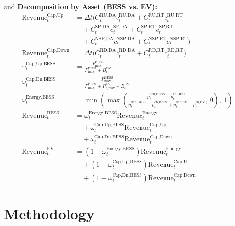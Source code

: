 \documentclass[conference]{IEEEtran}
\begin{document}
{and
\noindent \textbf{Decomposition by Asset (BESS vs. EV):}
\begin{align}
    \text{Revenue}_{t}^{\text{Cap,Up}} &= \Delta t \Big( C_{t}^{\text{RU,DA}} c_{t}^{\text{RU,DA}} + C_{t}^{\text{RU,RT}} c_{t}^{\text{RU,RT}} \nonumber \\
    & \quad + C_{t}^{\text{SP,DA}} c_{t}^{\text{SP,DA}} + C_{t}^{\text{SP,RT}} c_{t}^{\text{SP,RT}} \nonumber \\
    & \quad + C_{t}^{\text{NSP,DA}} c_{t}^{\text{NSP,DA}} + C_{t}^{\text{NSP,RT}} c_{t}^{\text{NSP,RT}} \Big) \\
    \text{Revenue}_{t}^{\text{Cap,Down}} &= \Delta t \Big( C_{t}^{\text{RD,DA}} c_{t}^{\text{RD,DA}} + C_{t}^{\text{RD,RT}} c_{t}^{\text{RD,RT}} \Big) \\
    \omega_{t}^{\text{Cap,Up,BESS}} &= \frac{P_{\text{max}}^{\text{BESS}}}{P_{\text{max}}^{\text{BESS}} + B_{t}^{\text{EV}}} \\
    \omega_{t}^{\text{Cap,Dn,BESS}} &= \frac{P_{\text{max}}^{\text{BESS}}}{P_{\text{max}}^{\text{BESS}} + P_{t, \text{max}}^{\text{EV}} - B_{t}^{\text{EV}}} \\
    \omega_{t}^{\text{Energy,BESS}} &= \min\left(\max\left(\frac{p_{t}^{\text{dch,BESS}} - p_{t}^{\text{ch,BESS}}}{p_{t}^{\text{dch,BESS}} - p_{t}^{\text{ch,BESS}} + p_{t}^{\text{dch,EV}} - p_{t}^{\text{ch,EV}}}, \, 0\right), \, 1\right) \\
    \text{Revenue}_{t}^{\text{BESS}} &= \omega_{t}^{\text{Energy,BESS}} \text{Revenue}_{t}^{\text{Energy}} \nonumber \\
    & \quad + \omega_{t}^{\text{Cap,Up,BESS}} \text{Revenue}_{t}^{\text{Cap,Up}} \nonumber \\
    & \quad + \omega_{t}^{\text{Cap,Dn,BESS}} \text{Revenue}_{t}^{\text{Cap,Down}} \\
    \text{Revenue}_{t}^{\text{EV}} &= (1 - \omega_{t}^{\text{Energy,BESS}}) \text{Revenue}_{t}^{\text{Energy}} \nonumber \\
    & \quad + (1 - \omega_{t}^{\text{Cap,Up,BESS}}) \text{Revenue}_{t}^{\text{Cap,Up}} \nonumber \\
    & \quad + (1 - \omega_{t}^{\text{Cap,Dn,BESS}}) \text{Revenue}_{t}^{\text{Cap,Down}}
\end{align}


} %


\section{Methodology}
\end{document}

